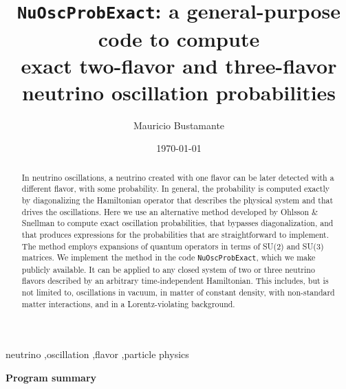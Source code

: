 \documentclass[final,5p,times,twocolumn]{elsarticle}
\begin{document}
\begin{frontmatter}

\title{{\tt NuOscProbExact}: a general-purpose code to compute\\
exact two-flavor and three-flavor neutrino oscillation probabilities}

\author{Mauricio Bustamante}
\address{Niels Bohr International Academy \& DARK, Niels Bohr Institute,\\University of Copenhagen, DK-2100 Copenhagen, Denmark}

\date{\today}

\begin{abstract}

In neutrino oscillations, a neutrino created with one flavor can be later detected with a different flavor, with some probability.  In general, the probability is computed exactly by diagonalizing the Hamiltonian operator that describes the physical system and that drives the oscillations.  Here we use an alternative method developed by Ohlsson \& Snellman to compute exact oscillation probabilities, that bypasses diagonalization, and that produces expressions for the probabilities that are straightforward to implement.  The method employs expansions of quantum operators in terms of SU(2) and SU(3) matrices.  We implement the method in the code {\tt NuOscProbExact}, which we make publicly available.  It can be applied to any closed system of two or three neutrino flavors described by an arbitrary time-independent Hamiltonian.  This includes, but is not limited to, oscillations in vacuum, in matter of constant density, with non-standard matter interactions, and in a Lorentz-violating background.  

\end{abstract}

\begin{keyword}

neutrino \sep oscillation \sep flavor \sep particle physics

\end{keyword}

\end{frontmatter}

\noindent
{\bf Program summary}
\smallskip
\end{document}
